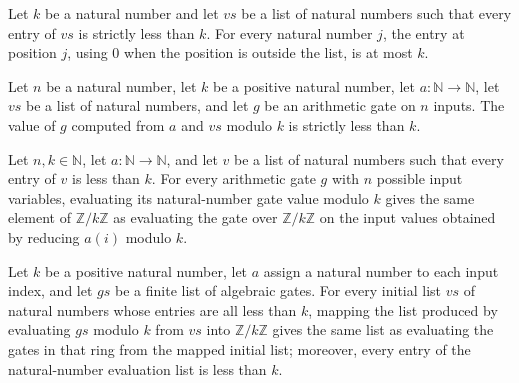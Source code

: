 \begin{theorem}
\label{Randomized.PIT.getD_le}
\leanok
{}
Let $k$ be a natural number and let $vs$ be a list of natural numbers such that every
entry of $vs$ is strictly less than $k$. For every natural number $j$, the entry at
position $j$, using $0$ when the position is outside the list, is at most $k$.
\end{theorem}

\begin{theorem}
\label{Randomized.PIT.gateVal_lt}
\leanok
{}
Let $n$ be a natural number, let $k$ be a positive natural number, let
$a:\mathbb{N}\to\mathbb{N}$, let $vs$ be a list of natural numbers, and let $g$ be an
arithmetic gate on $n$ inputs. The value of $g$ computed from $a$ and $vs$ modulo $k$ is
strictly less than $k$.
\end{theorem}

\begin{theorem}
\label{Randomized.PIT.natCast_gateVal}
\leanok
{}
Let $n,k\in\mathbb{N}$, let $a:\mathbb{N}\to\mathbb{N}$, and let $v$ be a list of
natural numbers such that every entry of $v$ is less than $k$. For every arithmetic gate
$g$ with $n$ possible input variables, evaluating its natural-number gate value modulo
$k$ gives the same element of $\mathbb{Z}/k\mathbb{Z}$ as evaluating the gate over
$\mathbb{Z}/k\mathbb{Z}$ on the input values obtained by reducing $a(i)$ modulo $k$.
\end{theorem}

\begin{theorem}
\label{Randomized.PIT.map_evalVals}
\leanok
{}
Let $k$ be a positive natural number, let $a$ assign a natural number to each input
index, and let $gs$ be a finite list of algebraic gates. For every initial list $vs$ of
natural numbers whose entries are all less than $k$, mapping the list produced by
evaluating $gs$ modulo $k$ from $vs$ into $\mathbb Z/k\mathbb Z$ gives the same list as
evaluating the gates in that ring from the mapped initial list; moreover, every entry of
the natural-number evaluation list is less than $k$.
\end{theorem}

